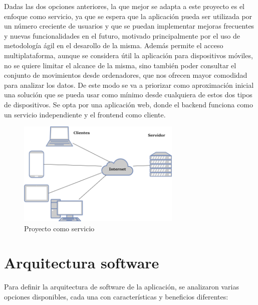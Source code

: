 Dadas las dos opciones anteriores, la que mejor se adapta a este proyecto es el enfoque como servicio, ya que se espera que la aplicación pueda ser utilizada por un número creciente de usuarios y que se puedan implementar mejoras frecuentes y nuevas funcionalidades en el futuro, motivado principalmente por el uso de metodología ágil en el desarollo de la misma. Además permite el acceso multiplataforma, aunque se considera útil la aplicación para dispositivos móviles, no se quiere limitar el alcance de la misma, sino también poder consultar el conjunto de movimientos desde ordenadores, que nos ofrecen mayor comodidad para analizar los datos. De este modo se va a priorizar como aproximación inicial una solución que se pueda usar como mínimo desde cualquiera de estos dos tipos de dispositivos. Se opta por una aplicación web, donde el backend funciona como un servicio independiente y el frontend como cliente.

\begin{figure}[ht!]
    \centering
    \includegraphics[height = 50mm]{imagenes/proyecto_servicio.drawio.png}
    \caption{Proyecto como servicio}
    \label{fig:proyecto_como_servicio}
    \end{figure}


\section{Arquitectura software}
Para definir la arquitectura de software de la aplicación, se analizaron varias opciones disponibles, cada una con características y beneficios diferentes\cite{albin2003art}\cite{garimilla2024art}:

